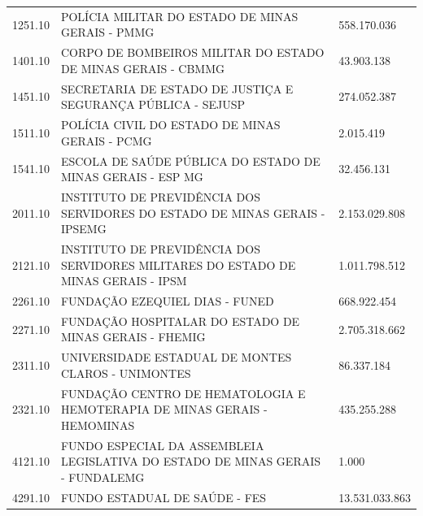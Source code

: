 \documentclass{article}
\begin{document}
\begin{longtable}[c]{m{3cm}|m{12cm}|m{3cm}}
\multicolumn{1}{C{3cm}|}{1251.10} & \multicolumn{1}{L{12cm}|}{POLÍCIA MILITAR DO ESTADO DE MINAS GERAIS - PMMG} & \multicolumn{1}{R{3cm}}{558.170.036} \\
\multicolumn{1}{C{3cm}|}{1401.10} & \multicolumn{1}{L{12cm}|}{CORPO DE BOMBEIROS MILITAR DO ESTADO DE MINAS GERAIS - CBMMG} & \multicolumn{1}{R{3cm}}{43.903.138} \\
\multicolumn{1}{C{3cm}|}{1451.10} & \multicolumn{1}{L{12cm}|}{SECRETARIA DE ESTADO DE JUSTIÇA E SEGURANÇA PÚBLICA - SEJUSP} & \multicolumn{1}{R{3cm}}{274.052.387} \\
\multicolumn{1}{C{3cm}|}{1511.10} & \multicolumn{1}{L{12cm}|}{POLÍCIA CIVIL DO ESTADO DE MINAS GERAIS - PCMG} & \multicolumn{1}{R{3cm}}{2.015.419} \\
\multicolumn{1}{C{3cm}|}{1541.10} & \multicolumn{1}{L{12cm}|}{ESCOLA DE SAÚDE PÚBLICA DO ESTADO DE MINAS GERAIS - ESP MG} & \multicolumn{1}{R{3cm}}{32.456.131} \\
\multicolumn{1}{C{3cm}|}{2011.10} & \multicolumn{1}{L{12cm}|}{INSTITUTO DE PREVIDÊNCIA DOS SERVIDORES DO ESTADO DE MINAS GERAIS - IPSEMG} & \multicolumn{1}{R{3cm}}{2.153.029.808} \\
\multicolumn{1}{C{3cm}|}{2121.10} & \multicolumn{1}{L{12cm}|}{INSTITUTO DE PREVIDÊNCIA DOS SERVIDORES MILITARES DO ESTADO DE MINAS GERAIS - IPSM} & \multicolumn{1}{R{3cm}}{1.011.798.512} \\
\multicolumn{1}{C{3cm}|}{2261.10} & \multicolumn{1}{L{12cm}|}{FUNDAÇÃO EZEQUIEL DIAS - FUNED} & \multicolumn{1}{R{3cm}}{668.922.454} \\
\multicolumn{1}{C{3cm}|}{2271.10} & \multicolumn{1}{L{12cm}|}{FUNDAÇÃO HOSPITALAR DO ESTADO DE MINAS GERAIS - FHEMIG} & \multicolumn{1}{R{3cm}}{2.705.318.662} \\
\multicolumn{1}{C{3cm}|}{2311.10} & \multicolumn{1}{L{12cm}|}{UNIVERSIDADE ESTADUAL DE MONTES CLAROS - UNIMONTES} & \multicolumn{1}{R{3cm}}{86.337.184} \\
\multicolumn{1}{C{3cm}|}{2321.10} & \multicolumn{1}{L{12cm}|}{FUNDAÇÃO CENTRO DE HEMATOLOGIA E HEMOTERAPIA DE MINAS GERAIS - HEMOMINAS} & \multicolumn{1}{R{3cm}}{435.255.288} \\
\multicolumn{1}{C{3cm}|}{4121.10} & \multicolumn{1}{L{12cm}|}{FUNDO ESPECIAL DA ASSEMBLEIA LEGISLATIVA DO ESTADO DE MINAS GERAIS - FUNDALEMG} & \multicolumn{1}{R{3cm}}{1.000} \\
\multicolumn{1}{C{3cm}|}{4291.10} & \multicolumn{1}{L{12cm}|}{FUNDO ESTADUAL DE SAÚDE - FES} & \multicolumn{1}{R{3cm}}{13.531.033.863} \\

\end{longtable}
\end{document}

